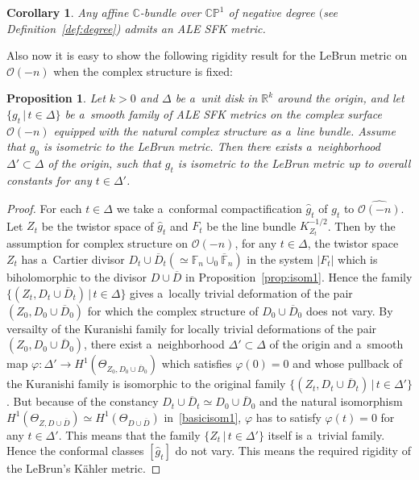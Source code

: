 \documentclass[pdftex]{sigma}
\numberwithin{equation}{section}
\newtheorem{Corollary}[Theorem]{Corollary}
\newtheorem{Proposition}[Theorem]{Proposition}
{\theoremstyle{definition}
\newtheorem{Definition}[Theorem]{Definition}
\newtheorem{Remark}[Theorem]{Remark}
}
\begin{document}
\begin{Corollary}\label{cor:exaf}
Any affine $\mathbb{C}$-bundle over $\mathbb{CP}^1$ of negative degree $($see Definition~{\rm \ref{def:degree})} admits an
ALE SFK metric.
\end{Corollary}

Also now it is easy to show the following rigidity result for the LeBrun metric on $\mathscr O(-n)$ when the complex
structure is f\/ixed:

\begin{Proposition}
\label{prop:rigid}
Let $k>0$ and $\Delta$ be a~unit disk in $\mathbb{R}^k$ around the origin, and let $\{g_t\,|\, t\in\Delta\}$ be
a~smooth family of ALE SFK metrics on the complex surface $\mathscr O(-n)$ equipped with the natural complex structure
as a~line bundle.
Assume that $g_0$ is isometric to the LeBrun metric.
Then there exists a~neighborhood $\Delta' \subset \Delta$ of the origin, such that $g_t$ is isometric to the LeBrun
metric up to overall constants for any $t\in\Delta'$.
\end{Proposition}

\begin{proof}
For each $t\in \Delta$ we take a~conformal compactif\/ication $\hat g_t$ of $g_t$ to $\widehat{\mathscr O(-n)}$.
Let $Z_t$ be the twistor space of $\hat g_t$ and $F_t$ be the line bundle $K_{Z_t}^{-1/2}$.
Then by the assumption for complex structure on $\mathscr O(-n)$, for any $t\in \Delta$, the twistor space $Z_t$ has
a~Cartier divisor $D_t\cup \overline D_t(\simeq \mathbb{F}_n\cup_0\overline{\mathbb{F}}_n)$ in the system $|F_t|$
which is biholomorphic to the divisor $D\cup \overline D$ in Proposition~\ref{prop:isom1}.
Hence the family $\{(Z_t,D_t\cup\overline D_t)\,|\, t\in\Delta\}$ gives a~locally trivial deformation of the pair
$(Z_0,D_0 \cup \overline D_0)$ for which the complex structure of $D_0\cup \overline D_0$ does not vary.
By versailty of the Kuranishi family for locally trivial deformations of the pair $(Z_0,D_0\cup \overline D_0)$, there
exist a~neighborhood $\Delta'\subset\Delta$ of the origin and a~smooth map $\varphi:\Delta'\to H^1(\Theta_{Z_0,D_0\cup
\overline D_0})$ which satisf\/ies $\varphi(0) = 0$ and whose pullback of the Kuranishi family is isomorphic to the
original family $\{(Z_t,D_t\cup \overline D_t)\,|\, t\in\Delta'\}$.
But because of the constancy $D_t\cup\overline D_t\simeq D_0\cup \overline D_0$ and the natural isomorphism $H^1 (
\Theta_{Z,  D \cup \overline D} ) \simeq H^1 (\Theta_{ D \cup \overline D} )$ in~\eqref{basicisom1}, $\varphi$ has
to satisfy $\varphi(t)=0$ for any $t\in\Delta'$.
This means that the family $\{Z_t\,|\, t\in \Delta'\}$ itself is a~trivial family.
Hence the conformal classes $[\hat g_t]$ do not vary.
This means the required rigidity of the LeBrun's K\"ahler metric.
\end{proof}
\end{document}
